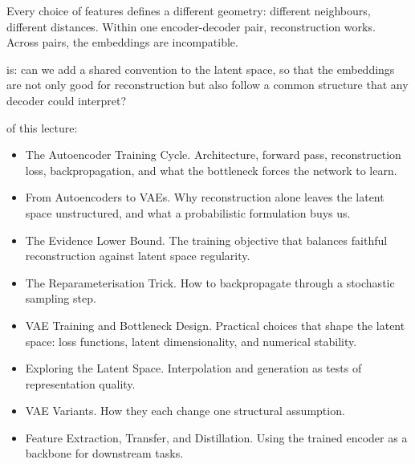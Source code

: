 
Every choice of features defines a different geometry: different neighbours, different distances.
Within one encoder-decoder pair, reconstruction works.
Across pairs, the embeddings are incompatible.

 is: can we add a shared convention to the latent space,
so that the embeddings are not only good for reconstruction but also follow a common structure
that any decoder could interpret?




 of this lecture:
\begin{itemize}
    \item The Autoencoder Training Cycle. Architecture, forward pass, reconstruction loss, backpropagation, and what the bottleneck forces the network to learn.
    \item From Autoencoders to VAEs. Why reconstruction alone leaves the latent space unstructured, and what a probabilistic formulation buys us.
    \item The Evidence Lower Bound. The training objective that balances faithful reconstruction against latent space regularity.
    \item The Reparameterisation Trick. How to backpropagate through a stochastic sampling step.
    \item VAE Training and Bottleneck Design. Practical choices that shape the latent space: loss functions, latent dimensionality, and numerical stability.
    \item Exploring the Latent Space. Interpolation and generation as tests of representation quality.
    \item VAE Variants. How they each change one structural assumption.
    \item Feature Extraction, Transfer, and Distillation. Using the trained encoder as a backbone for downstream tasks.
\end{itemize}








